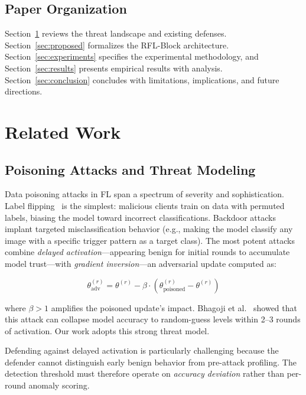 \documentclass[conference]{IEEEtran}
\begin{document}
\subsection{Paper Organization}
Section~\ref{sec:related} reviews the threat landscape and existing defenses. Section~\ref{sec:proposed} formalizes the RFL-Block architecture. Section~\ref{sec:experiments} specifies the experimental methodology, and Section~\ref{sec:results} presents empirical results with analysis. Section~\ref{sec:conclusion} concludes with limitations, implications, and future directions.

\section{Related Work}
\label{sec:related}

\subsection{Poisoning Attacks and Threat Modeling}
Data poisoning attacks in FL span a spectrum of severity and sophistication. Label flipping~\cite{tolanietal2020} is the simplest: malicious clients train on data with permuted labels, biasing the model toward incorrect classifications. Backdoor attacks~\cite{bagdasaryan2020backdoor} implant targeted misclassification behavior (e.g., making the model classify any image with a specific trigger pattern as a target class). The most potent attacks combine \emph{delayed activation}---appearing benign for initial rounds to accumulate model trust---with \emph{gradient inversion}---an adversarial update computed as:

\begin{equation}
\theta_{\text{adv}}^{(r)} = \theta^{(r)} - \beta \cdot (\theta_{\text{poisoned}}^{(r)} - \theta^{(r)})
\label{eq:invasion}
\end{equation}

where $\beta > 1$ amplifies the poisoned update's impact. Bhagoji et al.~\cite{bhagoji2019poisoning} showed that this attack can collapse model accuracy to random-guess levels within 2--3 rounds of activation. Our work adopts this strong threat model.

Defending against delayed activation is particularly challenging because the defender cannot distinguish early benign behavior from pre-attack profiling. The detection threshold must therefore operate on \emph{accuracy deviation} rather than per-round anomaly scoring.
\end{document}
